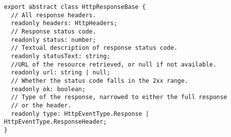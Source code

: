\begin{verbatim}
export abstract class HttpResponseBase {
  // All response headers.
  readonly headers: HttpHeaders;
  // Response status code.
  readonly status: number;
  // Textual description of response status code.
  readonly statusText: string;
  //URL of the resource retrieved, or null if not available.
  readonly url: string | null;
  // Whether the status code falls in the 2xx range.
  readonly ok: boolean;
  // Type of the response, narrowed to either the full response
  // or the header.
  readonly type: HttpEventType.Response | HttpEventType.ResponseHeader;
}
\end{verbatim}
